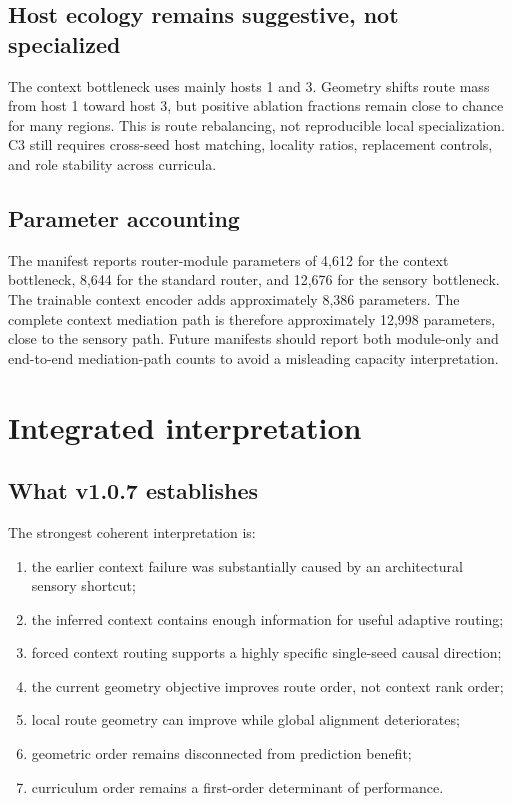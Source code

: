 \documentclass[11pt,a4paper]{article}
\begin{document}
\subsection{Host ecology remains suggestive, not specialized}

The context bottleneck uses mainly hosts 1 and 3. Geometry shifts route mass from host 1 toward host 3, but positive ablation fractions remain close to chance for many regions. This is route rebalancing, not reproducible local specialization. C3 still requires cross-seed host matching, locality ratios, replacement controls, and role stability across curricula.

\subsection{Parameter accounting}

The manifest reports router-module parameters of 4,612 for the context bottleneck, 8,644 for the standard router, and 12,676 for the sensory bottleneck. The trainable context encoder adds approximately 8,386 parameters. The complete context mediation path is therefore approximately 12,998 parameters, close to the sensory path. Future manifests should report both module-only and end-to-end mediation-path counts to avoid a misleading capacity interpretation.

\section{Integrated interpretation}

\subsection{What v1.0.7 establishes}

The strongest coherent interpretation is:

\begin{enumerate}
\item the earlier context failure was substantially caused by an architectural sensory shortcut;
\item the inferred context contains enough information for useful adaptive routing;
\item forced context routing supports a highly specific single-seed causal direction;
\item the current geometry objective improves route order, not context rank order;
\item local route geometry can improve while global alignment deteriorates;
\item geometric order remains disconnected from prediction benefit;
\item curriculum order remains a first-order determinant of performance.
\end{enumerate}
\end{document}
